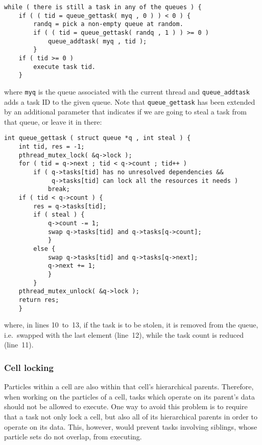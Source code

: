 \documentclass[final]{siamltex}
\begin{document}
\begin{center}\begin{minipage}{0.8\textwidth}
    \begin{lstlisting}
while ( there is still a task in any of the queues ) {
    if ( ( tid = queue_gettask( myq , 0 ) ) < 0 ) {
        randq = pick a non-empty queue at random.
        if ( ( tid = queue_gettask( randq , 1 ) ) >= 0 )
            queue_addtask( myq , tid );
        }
    if ( tid >= 0 )
        execute task tid.
    }
    \end{lstlisting}
\end{minipage}\end{center}

\noindent where {\tt myq} is the queue associated with the
current thread and {\tt queue\_addtask} adds a task ID
to the given queue.
Note that {\tt queue\_gettask} has been extended by an
additional parameter that indicates if we are going to steal
a task from that queue, or leave it in there:

\begin{center}\begin{minipage}{0.8\textwidth}
    \begin{lstlisting}
int queue_gettask ( struct queue *q , int steal ) {
    int tid, res = -1;
    pthread_mutex_lock( &q->lock );
    for ( tid = q->next ; tid < q->count ; tid++ )
        if ( q->tasks[tid] has no unresolved dependencies &&
             q->tasks[tid] can lock all the resources it needs )
            break;
    if ( tid < q->count ) {
        res = q->tasks[tid];
        if ( steal ) {
            q->count -= 1;
            swap q->tasks[tid] and q->tasks[q->count];
            }
        else {
            swap q->tasks[tid] and q->tasks[q->next];
            q->next += 1;
            }
        }
    pthread_mutex_unlock( &q->lock );
    return res;
    }
    \end{lstlisting}
\end{minipage}\end{center}

\noindent where, in lines 10~to~13, if the task is to be stolen,
it is removed from the queue, i.e.~swapped with the last element (line~12),
while the task count is reduced (line~11).


\subsubsection{Cell locking}

Particles within a cell are also within that cell's hierarchical
parents.
Therefore, when working on the particles of a cell, tasks which
operate on its parent's data should not be allowed to execute.
One way to avoid this problem is to require that a task
not only lock a cell, but also all of its hierarchical
parents in order to operate on its data.
This, however, would prevent tasks involving siblings,
whose particle sets do not overlap, from executing.
\end{document}
